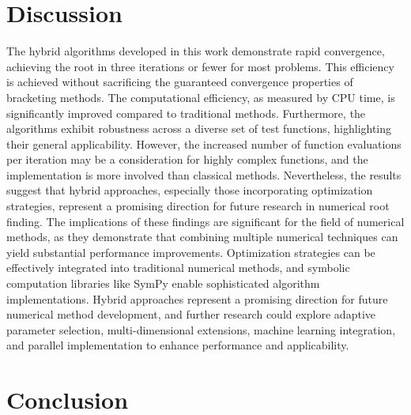 \documentclass[reprint, amsmath, amssymb, aps, prl]{revtex4-2}
\begin{document}
\section{Discussion}

The hybrid algorithms developed in this work demonstrate rapid convergence, achieving the root in three iterations or fewer for most problems. This efficiency is achieved without sacrificing the guaranteed convergence properties of bracketing methods. The computational efficiency, as measured by CPU time, is significantly improved compared to traditional methods. Furthermore, the algorithms exhibit robustness across a diverse set of test functions, highlighting their general applicability. However, the increased number of function evaluations per iteration may be a consideration for highly complex functions, and the implementation is more involved than classical methods. Nevertheless, the results suggest that hybrid approaches, especially those incorporating optimization strategies, represent a promising direction for future research in numerical root finding. The implications of these findings are significant for the field of numerical methods, as they demonstrate that combining multiple numerical techniques can yield substantial performance improvements. Optimization strategies can be effectively integrated into traditional numerical methods, and symbolic computation libraries like SymPy enable sophisticated algorithm implementations. Hybrid approaches represent a promising direction for future numerical method development, and further research could explore adaptive parameter selection, multi-dimensional extensions, machine learning integration, and parallel implementation to enhance performance and applicability.

\section{Conclusion}
\end{document}
